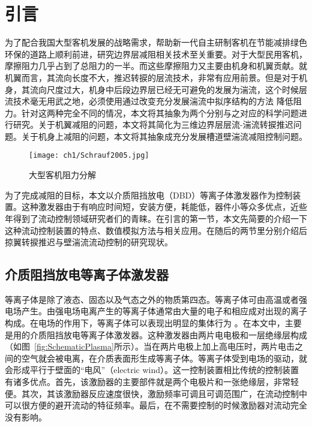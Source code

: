 \chapter{引言}
\label{cha:intro}

为了配合我国大型客机发展的战略需求，帮助新一代自主研制客机在节能减排绿色环保的道路上顺利前进，研究边界层减阻相关技术至关重要。对于大型民用客机，摩擦阻力几乎占到了总阻力的一半\cite{Schrauf2005}。而这些摩擦阻力又主要由机身和机翼贡献。就机翼而言，其流向长度不大，推迟转捩的层流技术，非常有应用前景\cite{Joslin1998}。但是对于机身，其流向尺度过大，机身中后段边界层已经无可避免的发展为湍流，这个时候层流技术毫无用武之地，必须使用通过改变充分发展湍流中拟序结构的方法 降低阻力。针对这两种完全不同的情况，本文将其抽象为两个分别与之对应的科学问题进行研究。关于机翼减阻的问题，本文将其简化为三维边界层层流-湍流转捩推迟问题。关于机身上减阻的问题，本文将其抽象成充分发展槽道壁湍流减阻控制问题。
\begin{figure}[htb]
  \centering
  \texttt{[image: ch1/Schrauf2005.jpg]}
  \caption{大型客机阻力分解\cite{Schrauf2005}}\label{f:Schrauf2005}
\end{figure}

为了完成减阻的目标，本文以介质阻挡放电（DBD）等离子体激发器作为控制装置。这种激发器由于有响应时间短，安装方便，耗能低，器件小等众多优点，近些年得到了流动控制领域研究者们的青睐。在引言的第一节，本文先简要的介绍一下这种流动控制装置的特点、数值模拟方法与相关应用。在随后的两节里分别介绍后掠翼转捩推迟与壁湍流流动控制的研究现状。


\section{介质阻挡放电等离子体激发器}

等离子体是除了液态、固态以及气态之外的物质第四态\cite{zhangguling2008,niewanshang2012}。等离子体可由高温或者强电场产生。由强电场电离产生的等离子体通常由大量的电子和相应成对出现的离子构成。在电场的作用下，等离子体可以表现出明显的集体行为
\cite{wuhong2015}。在本文中，主要是用的介质阻挡放电等离子体激发器。这种激发器由两片电电极和一层绝缘层构成（如图~\ref{fig:SchematicPlasma}所示）。当在两片电极上加上高电压时，两片电击之间的空气就会被电离，在介质表面形生成等离子体。等离子体受到电场的驱动，就会形成平行于壁面的“电风”（electric wind）。这一控制装置相比传统的控制装置有诸多优点\cite{Corke2010}。首先，该激励器的主要部件就是两个电极片和一张绝缘层，非常轻便。其次，其该激励器反应速度很快，激励频率可调且可调范围广，在流动控制中可以很方便的避开流动的特征频率。最后，在不需要控制的时候激励器对流动完全没有影响。


